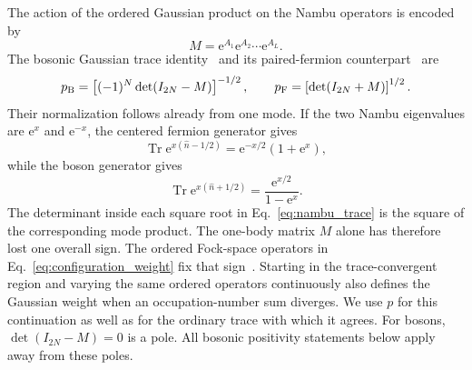 \documentclass[onecolumn,aps,prb,amsmath,amssymb,superscriptaddress,longbibliography]{revtex4-2}
\newcommand{\Tr}{\operatorname{Tr}}
\newcommand{\ee}{\mathrm{e}}
\begin{document}
The action of the ordered Gaussian product on the Nambu operators is encoded by
\begin{equation}
    M=\ee^{A_1}\ee^{A_2}\cdots\ee^{A_L}.
    \label{eq:propagation_matrix}
\end{equation}
The bosonic Gaussian trace identity~\cite{munn1978ensemble} and its paired-fermion counterpart~\cite{klich2014jstat} are
\begin{equation}
    p_{\rm B}=\left[(-1)^N\det(I_{2N}-M)\right]^{-1/2},
    \qquad
    p_{\rm F}=\left[\det(I_{2N}+M)\right]^{1/2}.
    \label{eq:nambu_trace}
\end{equation}
Their normalization follows already from one mode.  If the two Nambu eigenvalues are \(\ee^x\) and \(\ee^{-x}\), the centered fermion generator gives
\begin{equation}
    \Tr\ee^{x(\hat n-1/2)}
    =\ee^{-x/2}(1+\ee^x),
    \label{eq:fermion_one_mode}
\end{equation}
while the boson generator gives
\begin{equation}
    \Tr\ee^{x(\hat n+1/2)}
    =\frac{\ee^{x/2}}{1-\ee^x}.
    \label{eq:boson_one_mode}
\end{equation}
The determinant inside each square root in Eq.~\eqref{eq:nambu_trace} is the square of the corresponding mode product.  The one-body matrix \(M\) alone has therefore lost one overall sign.  The ordered Fock-space operators in Eq.~\eqref{eq:configuration_weight} fix that sign~\cite{klich2014jstat}.  Starting in the trace-convergent region and varying the same ordered operators continuously also defines the Gaussian weight when an occupation-number sum diverges.  We use \(p\) for this continuation as well as for the ordinary trace with which it agrees.  For bosons, \(\det(I_{2N}-M)=0\) is a pole.  All bosonic positivity statements below apply away from these poles.
\end{document}
